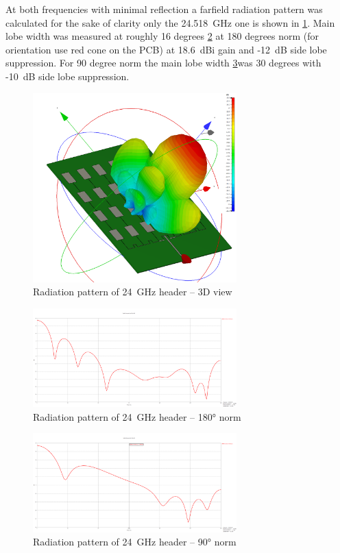 At both frequencies with minimal reflection a farfield radiation pattern was calculated for the sake of clarity only the 24.518~GHz one is shown in \ref{fig:farfield3d}.
Main lobe width was measured at roughly 16 degrees \ref{fig:farfield180} at 180 degrees norm (for orientation use red cone on the PCB) at 18.6~dBi gain and -12~dB side lobe suppression.
For 90 degree norm the main lobe width \ref{fig:farfield90}was 30 degrees with -10~dB side lobe suppression.

\begin{figure}[h!]
	\centering
	\includegraphics[width=0.7\textwidth]{../img/farfield3d.png}
	\caption[Radiation pattern of 24~GHz header -- 3D view]{Radiation pattern of 24~GHz header -- 3D view}
	\label{fig:farfield3d}
\end{figure}

\begin{figure}[h!]
	\centering
	\includegraphics[width=0.7\textwidth]{../img/farfield180.png}
	\caption[Radiation pattern of 24~GHz header -- 180° norm]{Radiation pattern of 24~GHz header -- 180° norm}
	\label{fig:farfield180}
\end{figure}

\begin{figure}[h!]
	\centering
	\includegraphics[width=0.7\textwidth]{../img/farfield90.png}
	\caption[Radiation pattern of 24~GHz header -- 90° norm]{Radiation pattern of 24~GHz header -- 90° norm}
	\label{fig:farfield90}
\end{figure}


